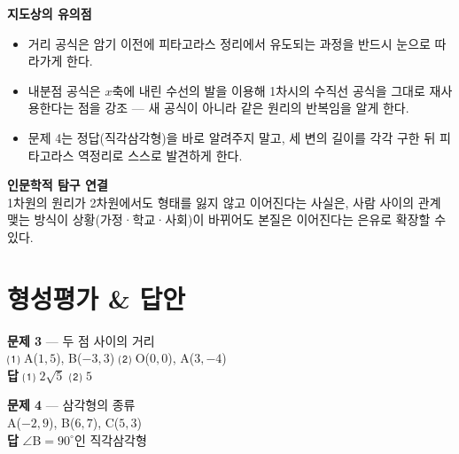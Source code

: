 \documentclass[11pt,a4paper]{article}
\begin{document}
\vspace{8pt}
\begin{minipage}[t]{0.48\linewidth}
\begin{calloutbox}
\textbf{지도상의 유의점}
\begin{itemize}[leftmargin=1.2em, itemsep=2pt, topsep=4pt]
  \item 거리 공식은 암기 이전에 피타고라스 정리에서 유도되는 과정을 반드시 눈으로 따라가게 한다.
  \item 내분점 공식은 $x$축에 내린 수선의 발을 이용해 1차시의 수직선 공식을 그대로 재사용한다는 점을 강조 --- 새 공식이 아니라 같은 원리의 반복임을 알게 한다.
  \item 문제 4는 정답(직각삼각형)을 바로 알려주지 말고, 세 변의 길이를 각각 구한 뒤 피타고라스 역정리로 스스로 발견하게 한다.
\end{itemize}
\end{calloutbox}
\end{minipage}\hfill
\begin{minipage}[t]{0.48\linewidth}
\begin{notebox}
\textbf{인문학적 탐구 연결}\\
1차원의 원리가 2차원에서도 형태를 잃지 않고 이어진다는 사실은, 사람 사이의 관계 맺는 방식이 상황(가정·학교·사회)이 바뀌어도 본질은 이어진다는 은유로 확장할 수 있다.
\end{notebox}
\end{minipage}

\section{형성평가 \& 답안}

\begin{minipage}[t]{0.48\linewidth}
\begin{answerbox}
\textbf{문제 3} --- 두 점 사이의 거리\\
\small ⑴ A($1,5$), B($-3,3$) \quad ⑵ O($0,0$), A($3,-4$)\\[4pt]
\textbf{\color{goldstrong}답} \; ⑴ $2\sqrt{5}$ \quad ⑵ $5$
\end{answerbox}
\end{minipage}\hfill
\begin{minipage}[t]{0.48\linewidth}
\begin{answerbox}
\textbf{문제 4} --- 삼각형의 종류\\
\small A($-2,9$), B($6,7$), C($5,3$)\\[4pt]
\textbf{\color{goldstrong}답} \; $\angle$B$=90^\circ$인 직각삼각형
\end{answerbox}
\end{minipage}
\end{document}
